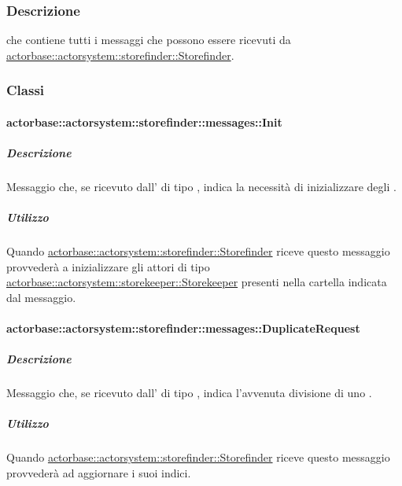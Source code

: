 \documentclass{scalatekids-article}
\begin{document}
\subsubsection{Descrizione}

 che contiene tutti i messaggi che possono essere ricevuti da
\hyperref[sec:actorbase::actorsystem::storefinder::Storefinder]{actorbase::actorsystem::storefinder::Storefinder}.

\subsubsection{Classi}

\paragraph{actorbase::actorsystem::storefinder::messages::Init}
\label{sec:actorbase::actorsystem::storefinder::messages::Init}

\subparagraph{Descrizione}

Messaggio che, se ricevuto dall' di tipo ,
indica la necessità di inizializzare degli .

\subparagraph{Utilizzo}

Quando \hyperref[sec:actorbase::actorsystem::storefinder::Storefinder]{actorbase::\allowbreak{}actorsystem::\allowbreak{}storefinder::\allowbreak{}Storefinder}
riceve questo messaggio provvederà a inizializzare gli attori di tipo
\hyperref[sec:actorbase::actorsystem::storekeeper::Storekeeper]{actorbase::\allowbreak{}actorsystem::\allowbreak{}storekeeper::\allowbreak{}Storekeeper}
presenti nella cartella indicata dal messaggio.

\paragraph{actorbase::actorsystem::storefinder::messages::DuplicateRequest}
\label{sec:actorbase::actorsystem::storefinder::messages::DuplicateRequest}

\subparagraph{Descrizione}

Messaggio che, se ricevuto dall' di tipo ,
indica l'avvenuta divisione di uno .

\subparagraph{Utilizzo}

Quando \hyperref[sec:actorbase::actorsystem::storefinder::Storefinder]{actorbase::\allowbreak{}actorsystem::\allowbreak{}storefinder::\allowbreak{}Storefinder}
riceve questo messaggio provvederà ad aggiornare i suoi indici.
\end{document}
